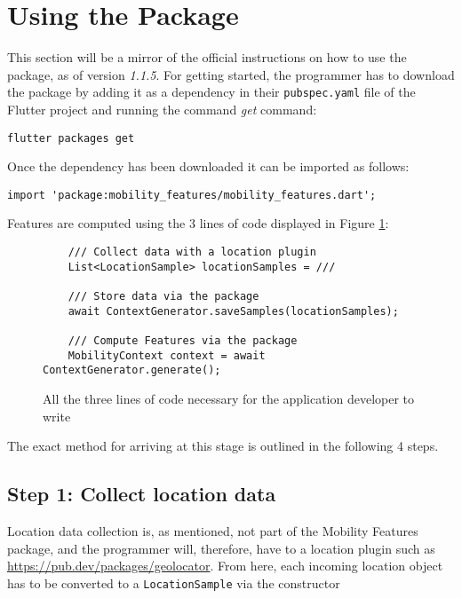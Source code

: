 \section{Using the Package}
This section will be a mirror of the official instructions on how to use the package, as of version \textit{1.1.5}. For getting started, the programmer has to download the package by adding it as a dependency in their \verb|pubspec.yaml| file of the Flutter project and running the command \textit{get} command:

\begin{verbatim}
flutter packages get
\end{verbatim}

Once the dependency has been downloaded it can be imported as follows:

\begin{verbatim}
import 'package:mobility_features/mobility_features.dart';
\end{verbatim}

Features are computed using the 3 lines of code displayed in Figure \ref{fig:code-example-intro}:

\begin{figure}[h]
    \centering
    \begin{verbatim}
    /// Collect data with a location plugin
    List<LocationSample> locationSamples = ///

    /// Store data via the package
    await ContextGenerator.saveSamples(locationSamples);
    
    /// Compute Features via the package
    MobilityContext context = await ContextGenerator.generate();
    \end{verbatim}
    \caption{All the three lines of code necessary for the application developer to write}
    \label{fig:code-example-intro}
\end{figure}

The exact method for arriving at this stage is outlined in the following 4 steps.

\subsection*{Step 1: Collect location data}
Location data collection is, as mentioned, not part of the Mobility Features package, and the programmer will, therefore, have to a location plugin such as \url{https://pub.dev/packages/geolocator}. From here, each incoming location object has to be converted to a \verb|LocationSample| via the constructor

